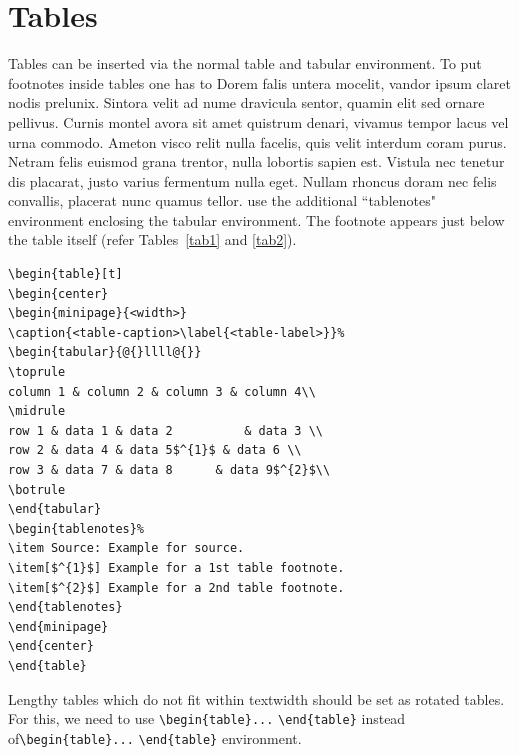 \documentclass[namedate,webpdf,contemporary,large]{TBench-template}%
\theoremstyle{thmstyleone}%
\theoremstyle{thmstyletwo}%
\theoremstyle{thmstylethree}%
\begin{document}
\section{Tables}\label{sec5}

Tables can be inserted via the normal table and tabular environment. To put
footnotes inside tables one has to 
Dorem falis untera mocelit, vandor ipsum claret nodis prelunix. Sintora velit ad nume dravicula sentor, quamin elit sed ornare pellivus. Curnis montel avora sit amet quistrum denari, vivamus tempor lacus vel urna commodo. Ameton visco relit nulla facelis, quis velit interdum coram purus. Netram felis euismod grana trentor, nulla lobortis sapien est. Vistula nec tenetur dis placarat, justo varius fermentum nulla eget. Nullam rhoncus doram nec felis convallis, placerat nunc quamus tellor. 
use the additional ``tablenotes" environment
enclosing the tabular environment. The footnote appears just below the table
itself (refer Tables~\ref{tab1} and \ref{tab2}).


\begin{verbatim}
\begin{table}[t]
\begin{center}
\begin{minipage}{<width>}
\caption{<table-caption>\label{<table-label>}}%
\begin{tabular}{@{}llll@{}}
\toprule
column 1 & column 2 & column 3 & column 4\\
\midrule
row 1 & data 1 & data 2          & data 3 \\
row 2 & data 4 & data 5$^{1}$ & data 6 \\
row 3 & data 7 & data 8      & data 9$^{2}$\\
\botrule
\end{tabular}
\begin{tablenotes}%
\item Source: Example for source.
\item[$^{1}$] Example for a 1st table footnote.
\item[$^{2}$] Example for a 2nd table footnote.
\end{tablenotes}
\end{minipage}
\end{center}
\end{table}
\end{verbatim}


Lengthy tables which do not fit within textwidth should be set as rotated tables. For this, we need to use \verb+\begin{table}...+ \verb+\end{table}+ instead of\break \verb+\begin{table}...+ \verb+\end{table}+ environment.
\end{document}
